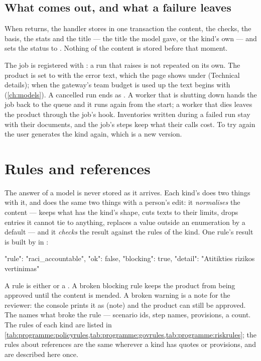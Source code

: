 \subsection{What comes out, and what a failure leaves}

When  returns, the handler stores in one transaction the content, the checks,
the basis, the stats and the title --- the title the model gave, or the kind's own --- and
sets the status to . Nothing of the content is stored before that moment.

The job is registered with : a run that raises is not repeated on its
own. The product is set to  with the error text, which the page shows under
 (Technical details); when the gateway's team budget is used up the
text begins with  (\cref{ch:models}). A cancelled run ends as
. A worker that is shutting down hands the job back to the queue and it runs
again from the start; a worker that dies leaves the product  through the job's
 hook. Inventories written during a failed run stay with their documents,
and the job's steps keep what their calls cost. To try again the user generates the kind
again, which is a new version.


\section{Rules and references}\label{sec:programme:rules}

The answer of a model is never stored as it arrives. Each kind's  does two
things with it, and does the same two things with a person's edit: it \emph{normalises} the
content --- keeps what has the kind's shape, cuts texts to their limits, drops entries it
cannot tie to anything, replaces a value outside an enumeration by a default --- and it
\emph{checks} the result against the rules of the kind. One rule's result is built by
 in :

\begin{codeblock}
{"rule": "raci_accountable", "ok": false, "blocking": true, "detail": "Atitikties rizikos vertinimas"}
\end{codeblock}

A rule is either  or a . A broken blocking rule keeps the product
from being approved until the content is mended. A broken warning is a note for the reviewer:
the console prints it as  (note) and the product can still be approved. The
 names what broke the rule --- scenario ids, step names, provisions, a count. The
rules of each kind are listed in
\cref{tab:programme:policyrules,tab:programme:govrules,tab:programme:riskrules}; the rules
about references are the same wherever a kind has quotes or provisions, and are described
here once.

